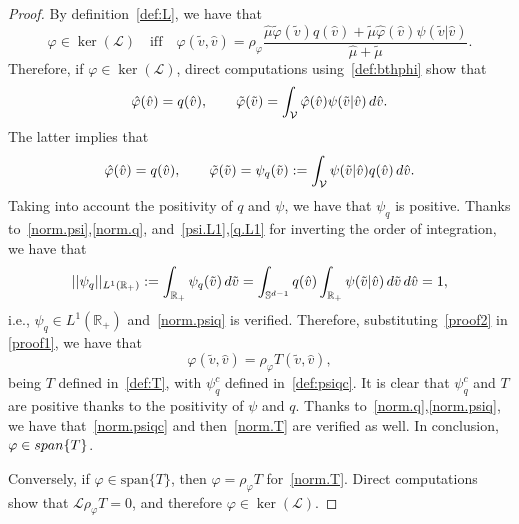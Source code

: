 \documentclass[10pt,a4paper]{amsart}
\newcommand{\R}{\mathbb{R}}
\newcommand{\hmu}{\hat{\mu}}
\newcommand{\hphi}{\hat{\varphi}}
\newcommand{\hv}{\hat{v}}
\newcommand{\intR}{\int_{\R_+}}
\newcommand{\intS}{\int_{\mathbb{S}^{d-1}}}
\newcommand{\intV}{\int_{\mathcal{V}}}
\newcommand{\tmu}{\tilde{\mu}}
\newcommand{\tphi}{\tilde{\varphi}}
\newcommand{\tv}{\tilde{v}}
\begin{document}
\begin{proof}
 By definition~\eqref{def:L}, we have that
 \begin{equation}\label{proof1}
 \varphi \in \ker(\mathcal{L}) \quad \text{iff} \quad \varphi(\tv,\hv) = \rho_{\varphi}\dfrac{\hmu \tphi(\tv)q(\hv)+\tmu\hphi (\hv) \psi(\tv|\hv)}{\hmu+\tmu}.
 \end{equation}
 Therefore, if $\varphi \in \ker(\mathcal{L})$, direct computations using~\eqref{def:bthphi} show that
 \[
 \hphi(\hv)= q(\hv), \qquad \tphi(\tv) = \intV \hphi(\hv) \psi(\tv|\hv) \, {\rm d} \hv.
 \]
 The latter implies that
\begin{equation}\label{proof2}
\hphi(\hv)= q(\hv), \qquad \tphi(\tv) = \psi_q(\tv) := \intV  \psi(\tv|\hv) q(\hv) \, {\rm d} \hv.
\end{equation}
Taking into account the positivity of $q$ and $\psi$, we have that $\psi_q$ is positive. Thanks to~\eqref{norm.psi},\eqref{norm.q}, and~\eqref{psi.L1},\eqref{q.L1} for inverting the order of integration, we have that 
\[
||\psi_q||_{L^1(\R_+)}:= \intR \psi_q(\tv) \, {\rm d} \tv = \intS q(\hv) \intR \psi(\tv|\hv) \, {\rm d} \tv \, {\rm d} \hv =1,
\]
i.e., $\psi_q \in L^1(\R_+)$ and~\eqref{norm.psiq} is verified.
Therefore, substituting~\eqref{proof2} in \eqref{proof1}, we have that
\[
\varphi(\tv,\hv)=\rho_{\varphi} T(\tv, \hv),
\]
being $T$ defined in~\eqref{def:T}, with $\psi_q^c$ defined in~\eqref{def:psiqc}. It is clear that $\psi_q^c$ and $T$ are positive thanks to the positivity of $\psi$ and $q$. Thanks to~\eqref{norm.q},\eqref{norm.psiq}, we have that~\eqref{norm.psiqc} and then~\eqref{norm.T} are verified as well. In conclusion, $\varphi \in {\rm span} \lbrace T \rbrace$. 

Conversely, if $\varphi \in \text{span}\lbrace T \rbrace$, then $\varphi=\rho_{\varphi} T$ for~\eqref{norm.T}. Direct computations show that $\mathcal{L}\rho_\varphi T=0$, and therefore $\varphi \in \ker(\mathcal{L})$.
\end{proof}
\end{document}
